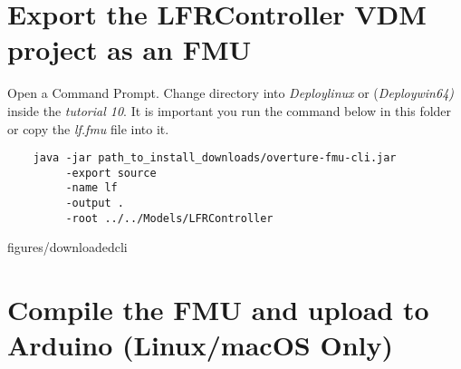 \documentclass[11pt,a4paper]{../tutorial}
\begin{document}
\section{Export the LFRController VDM project as an FMU}

\begin{instructions} 

\item Open a Command Prompt. Change directory into  \emph{Deploy\pathsep linux} or (\emph{Deploy\pathsep win64)}   inside the \emph{tutorial 10}. It is important you run the command below in this folder or copy the \emph{lf.fmu} file  into it.
	\begin{verbatim}
	java -jar path_to_install_downloads/overture-fmu-cli.jar 
	     -export source 
	     -name lf 
	     -output . 
	     -root ../../Models/LFRController
	\end{verbatim}

	\begin{annotation}[width=0.85\linewidth]{figures/downloadedcli}
	\end{annotation}

\end{instructions}

\newpage

\section{Compile the FMU and upload to Arduino (Linux/macOS Only)}
\end{document}
